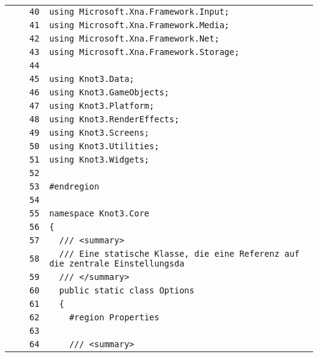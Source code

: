 \documentclass[a4paper,10pt]{article}
\begin{document}
\begin{longtable}[l]{lrrl}
\cellcolor{gray} &  & \verb~40~ & \verb~using Microsoft.Xna.Framework.Input;~\\
\cellcolor{gray} &  & \verb~41~ & \verb~using Microsoft.Xna.Framework.Media;~\\
\cellcolor{gray} &  & \verb~42~ & \verb~using Microsoft.Xna.Framework.Net;~\\
\cellcolor{gray} &  & \verb~43~ & \verb~using Microsoft.Xna.Framework.Storage;~\\
\cellcolor{gray} &  & \verb~44~ & \verb~~\\
\cellcolor{gray} &  & \verb~45~ & \verb~using Knot3.Data;~\\
\cellcolor{gray} &  & \verb~46~ & \verb~using Knot3.GameObjects;~\\
\cellcolor{gray} &  & \verb~47~ & \verb~using Knot3.Platform;~\\
\cellcolor{gray} &  & \verb~48~ & \verb~using Knot3.RenderEffects;~\\
\cellcolor{gray} &  & \verb~49~ & \verb~using Knot3.Screens;~\\
\cellcolor{gray} &  & \verb~50~ & \verb~using Knot3.Utilities;~\\
\cellcolor{gray} &  & \verb~51~ & \verb~using Knot3.Widgets;~\\
\cellcolor{gray} &  & \verb~52~ & \verb~~\\
\cellcolor{gray} &  & \verb~53~ & \verb~#endregion~\\
\cellcolor{gray} &  & \verb~54~ & \verb~~\\
\cellcolor{gray} &  & \verb~55~ & \verb~namespace Knot3.Core~\\
\cellcolor{gray} &  & \verb~56~ & \verb~{~\\
\cellcolor{gray} &  & \verb~57~ & \verb~  /// <summary>~\\
\cellcolor{gray} &  & \verb~58~ & \verb~  /// Eine statische Klasse, die eine Referenz auf die zentrale Einstellungsda~\\
\cellcolor{gray} &  & \verb~59~ & \verb~  /// </summary>~\\
\cellcolor{gray} &  & \verb~60~ & \verb~  public static class Options~\\
\cellcolor{gray} &  & \verb~61~ & \verb~  {~\\
\cellcolor{gray} &  & \verb~62~ & \verb~    #region Properties~\\
\cellcolor{gray} &  & \verb~63~ & \verb~~\\
\cellcolor{gray} &  & \verb~64~ & \verb~    /// <summary>~\\

\end{longtable}
\end{document}
